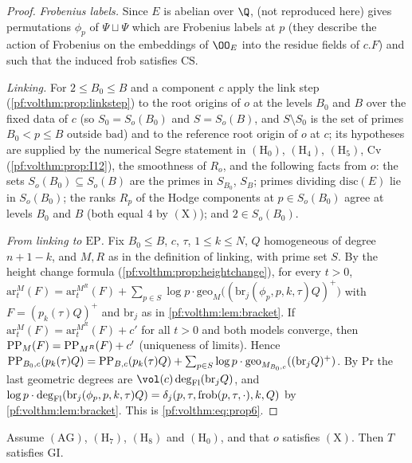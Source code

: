 \begin{proof}
\emph{Frobenius labels.} Since $E$ is abelian over $\Q$,  (not reproduced
here) gives permutations $\phi_p$ of $\Psi\sqcup\Psi$ which are Frobenius labels at $p$ (they describe the
action of Frobenius on the embeddings of $\OO_E$ into the residue fields of $c.F$) and such that the induced
$\mathrm{frob}$ satisfies $\mathrm{CS}$.

\emph{Linking.} For $2\le B_0\le B$ and a component $c$ apply the link step (\cref{pf:volthm:prop:linkstep}) to the
root origins of $o$ at the levels $B_0$ and $B$ over the fixed data of $c$ (so $S_0=S_o(B_0)$ and $S=S_o(B)$, and
$S\setminus S_0$ is the set of primes $B_0<p\le B$ outside $\mathrm{bad}$) and to the reference root origin of $o$
at $c$; its hypotheses are supplied by
the numerical Segre statement in $(\mathrm{H}_0)$, $(\mathrm{H}_4)$, $(\mathrm{H}_5)$,
$\mathrm{Cv}$ (\cref{pf:volthm:prop:I12}), the smoothness of $R_o$, and the following facts from $o$: the sets
$S_o(B_0)\subseteq S_o(B)$ are the primes in $S_{B_0}$, $S_B$; primes dividing $\mathrm{disc}(E)$ lie in
$S_o(B_0)$; the ranks $R_p$ of the Hodge components at $p\in S_o(B_0)$ agree at levels $B_0$ and $B$ (both equal
$4$ by $(\mathrm{X})$); and $2\in S_o(B_0)$.

\emph{From linking to $\mathrm{EP}$.} Fix $B_0\le B$, $c$, $\tau$, $1\le k\le N$, $Q$ homogeneous of degree
$n+1-k$, and $M,R$ as in the definition of linking, with prime set $S$. By the height change formula
(\cref{pf:volthm:prop:heightchange}), for every $t>0$,
$\mathrm{ar}^M_t(F)=\mathrm{ar}^{M^R}_t(F)+\sum_{p\in S}\log p\cdot\mathrm{geo}_M\bigl((\mathrm{br}_{j}(\phi_p,p,k,\tau)Q)^+\bigr)$
with $F=(p_k(\tau)Q)^+$ and $\mathrm{br}_j$ as in \cref{pf:volthm:lem:bracket}. If $\mathrm{ar}^M_t(F)=
\mathrm{ar}^{M^R}_t(F)+c'$ for all $t>0$ and both models converge, then $\mathrm{PP}_M(F)=\mathrm{PP}_{M^R}(F)+c'$ (uniqueness of
limits). Hence
$\mathrm{PP}_{B_0,c}(p_k(\tau)Q)=\mathrm{PP}_{B,c}(p_k(\tau)Q)+\sum_{p\in S}\log p\cdot\mathrm{geo}_{M_{B_0,c}}((\mathrm{br}_jQ)^+)$.
By $\mathrm{Pr}$ the last geometric degrees are $\vol(c)\volthmdeg(\mathrm{br}_jQ)$, and
$\log p\cdot\deg_{\mathrm{Fl}}(\mathrm{br}_j(\phi_p,p,k,\tau)Q)=\delta_j(p,\tau,\mathrm{frob}(p,\tau,\cdot),k,Q)$ by
\cref{pf:volthm:lem:bracket}. This is \eqref{pf:volthm:eq:prop6}.
\end{proof}

\begin{proposition}\label{pf:volthm:prop:propA}
Assume $(\mathrm{AG})$, $(\mathrm{H}_7)$, $(\mathrm{H}_8)$ and $(\mathrm{H}_0)$, and that $o$ satisfies
$(\mathrm{X})$. Then $T$ satisfies $\mathrm{GI}$.
\end{proposition}

